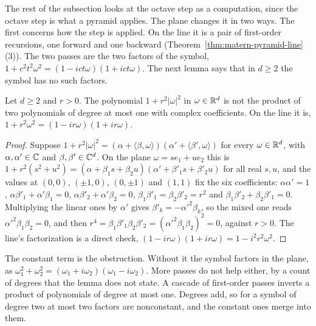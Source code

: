 The rest of the subsection looks at the octave step as a computation, since the octave step is what
a pyramid applies. The plane changes it in two ways. The first concerns how the step is applied. On
the line it is a pair of first-order recursions, one forward and one backward
(Theorem~\ref{thm:matern-pyramid-line}(3)). The two passes are the two factors of the symbol,
$1 + c^2t^2\omega^2 = (1 - ict\omega)(1 + ict\omega)$. The next lemma says that in $d \ge 2$ the
symbol has no such factors.

\begin{lemma}
\label{lem:no-first-order-factorization}

Let $d \ge 2$ and $r > 0$. The polynomial $1 + r^2|\omega|^2$ in $\omega \in \mathbb{R}^d$ is not the
product of two polynomials of degree at most one with complex coefficients. On the line it is,
$1 + r^2\omega^2 = (1 - ir\omega)(1 + ir\omega)$.
\end{lemma}

\begin{proof}
Suppose $1 + r^2|\omega|^2 = (\alpha + \langle\beta,\omega\rangle)(\alpha' + \langle\beta',\omega\rangle)$
for every $\omega \in \mathbb{R}^d$, with $\alpha,\alpha' \in \mathbb{C}$ and $\beta,\beta' \in \mathbb{C}^d$. On the plane
$\omega = se_1 + ue_2$ this is
$1 + r^2(s^2 + u^2) = (\alpha + \beta_1s + \beta_2u)(\alpha' + \beta'_1s + \beta'_2u)$ for all real
$s, u$, and the values at $(0,0)$, $(\pm1,0)$, $(0,\pm1)$ and $(1,1)$ fix the six coefficients:
$\alpha\alpha' = 1$, $\alpha\beta'_1 + \alpha'\beta_1 = 0$, $\alpha\beta'_2 + \alpha'\beta_2 = 0$,
$\beta_1\beta'_1 = \beta_2\beta'_2 = r^2$ and $\beta_1\beta'_2 + \beta_2\beta'_1 = 0$. Multiplying the
linear ones by $\alpha'$ gives $\beta'_k = -\alpha'^2\beta_k$, so the mixed one reads
$\alpha'^2\beta_1\beta_2 = 0$, and then
$r^4 = \beta_1\beta'_1\beta_2\beta'_2 = (\alpha'^2\beta_1\beta_2)^2 = 0$, against $r > 0$. The line's
factorization is a direct check, $(1 - ir\omega)(1 + ir\omega) = 1 - i^2r^2\omega^2$.
\end{proof}

The constant term is the obstruction. Without it the symbol factors in the plane, as
$\omega_1^2 + \omega_2^2 = (\omega_1 + i\omega_2)(\omega_1 - i\omega_2)$. More passes do not help
either, by a count of degrees that the lemma does not state. A cascade of first-order passes
inverts a product of polynomials of degree at most one. Degrees add, so for a symbol of degree two
at most two factors are nonconstant, and the constant ones merge into them.

